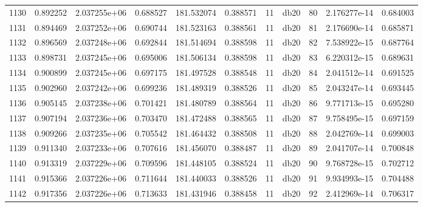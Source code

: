 \begin{tabular}{lrrrrrrlrrr}
1130 &    0.892252 &        2.037255e+06 &  0.688527 &              181.532074 &    0.388571 &      11 &         db20 &     80 &   2.176277e-14 &      0.684003 \\
1131 &    0.894469 &        2.037252e+06 &  0.690744 &              181.523163 &    0.388561 &      11 &         db20 &     81 &   2.176690e-14 &      0.685871 \\
1132 &    0.896569 &        2.037248e+06 &  0.692844 &              181.514694 &    0.388598 &      11 &         db20 &     82 &   7.538922e-15 &      0.687764 \\
1133 &    0.898731 &        2.037245e+06 &  0.695006 &              181.506134 &    0.388598 &      11 &         db20 &     83 &   6.220312e-15 &      0.689631 \\
1134 &    0.900899 &        2.037245e+06 &  0.697175 &              181.497528 &    0.388548 &      11 &         db20 &     84 &   2.041512e-14 &      0.691525 \\
1135 &    0.902960 &        2.037242e+06 &  0.699236 &              181.489319 &    0.388526 &      11 &         db20 &     85 &   2.043247e-14 &      0.693445 \\
1136 &    0.905145 &        2.037238e+06 &  0.701421 &              181.480789 &    0.388564 &      11 &         db20 &     86 &   9.771713e-15 &      0.695280 \\
1137 &    0.907194 &        2.037236e+06 &  0.703470 &              181.472488 &    0.388565 &      11 &         db20 &     87 &   9.758495e-15 &      0.697159 \\
1138 &    0.909266 &        2.037235e+06 &  0.705542 &              181.464432 &    0.388508 &      11 &         db20 &     88 &   2.042769e-14 &      0.699003 \\
1139 &    0.911340 &        2.037233e+06 &  0.707616 &              181.456070 &    0.388487 &      11 &         db20 &     89 &   2.041707e-14 &      0.700848 \\
1140 &    0.913319 &        2.037229e+06 &  0.709596 &              181.448105 &    0.388524 &      11 &         db20 &     90 &   9.768728e-15 &      0.702712 \\
1141 &    0.915366 &        2.037226e+06 &  0.711644 &              181.440033 &    0.388526 &      11 &         db20 &     91 &   9.934993e-15 &      0.704488 \\
1142 &    0.917356 &        2.037226e+06 &  0.713633 &              181.431946 &    0.388458 &      11 &         db20 &     92 &   2.412969e-14 &      0.706317 \\

\end{tabular}
